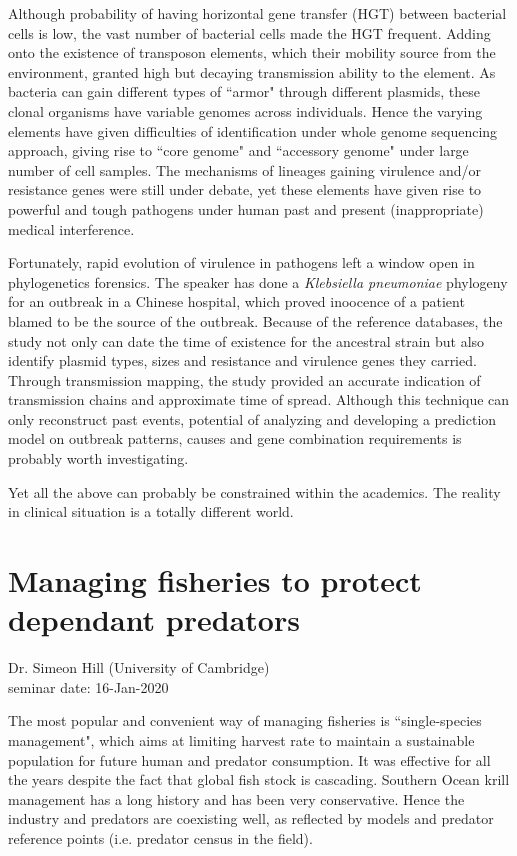\documentclass{article}
\begin{document}
    Although probability of having horizontal gene transfer (HGT) between bacterial cells is low, the vast number of bacterial cells made the HGT frequent.  Adding onto the existence of transposon elements, which their mobility source from the environment, granted high but decaying transmission ability to the element.  As bacteria can gain different types of ``armor" through different plasmids, these clonal organisms have variable genomes across individuals.  Hence the varying elements have given difficulties of identification under whole genome sequencing approach, giving rise to ``core genome" and ``accessory genome" under large number of cell samples.  The mechanisms of lineages gaining virulence and/or resistance genes were still under debate, yet these elements have given rise to powerful and tough pathogens under human past and present (inappropriate) medical interference.
    
    Fortunately, rapid evolution of virulence in pathogens left a window open in phylogenetics forensics.  The speaker has done a \textit{Klebsiella pneumoniae} phylogeny for an outbreak in a Chinese hospital, which proved inoocence of a patient blamed to be the source of the outbreak.  Because of the reference databases, the study not only can date the time of existence for the ancestral strain but also identify plasmid types, sizes and resistance and virulence genes they carried.  Through transmission mapping, the study provided an accurate indication of transmission chains and approximate time of spread.  Although this technique can only reconstruct past events, potential of analyzing and developing a prediction model on outbreak patterns, causes and gene combination requirements is probably worth investigating.
    
    Yet all the above can probably be constrained within the academics.  The reality in clinical situation is a totally different world.
    \clearpage
    
    \section{Managing fisheries to protect dependant predators}
    \begin{flushright}
        \large{Dr. Simeon Hill (University of Cambridge)}\\
        seminar date: 16-Jan-2020
    \end{flushright}
    The most popular and convenient way of managing fisheries is ``single-species management", which aims at limiting harvest rate to maintain a sustainable population for future human and predator consumption.  It was effective for all the years despite the fact that global fish stock is cascading.  Southern Ocean krill management has a long history and has been very conservative.  Hence the industry and predators are coexisting well, as reflected by models and predator reference points (i.e. predator census in the field).
    
\end{document}
